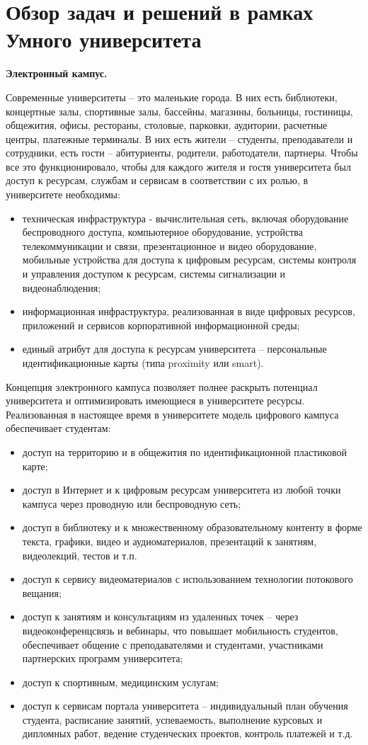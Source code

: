 
\section{Обзор задач и решений в рамках Умного университета}

\textbf{Электронный кампус.}

Современные университеты – это маленькие города.\cite{Cisco} В них есть библиотеки, концертные залы, спортивные залы, бассейны, магазины, больницы, гостиницы, общежития, офисы, рестораны, столовые, парковки, аудитории, расчетные центры, платежные терминалы. В них есть жители – студенты, преподаватели и сотрудники, есть гости – абитуриенты, родители, работодатели, партнеры. Чтобы все это функционировало, чтобы для каждого жителя и гостя университета был доступ к ресурсам, службам и сервисам в соответствии с их ролью,  в университете необходимы:
 \begin{itemize}
	\item техническая инфраструктура - вычислительная сеть, включая оборудование беспроводного доступа, компьютерное оборудование, устройства телекоммуникации и связи, презентационное и видео оборудование, мобильные устройства для доступа к цифровым ресурсам,  системы контроля и управления доступом к ресурсам, системы сигнализации и видеонаблюдения;
	\item информационная инфраструктура, реализованная в виде цифровых ресурсов, приложений и сервисов корпоративной информационной среды;
	\item единый атрибут для доступа к ресурсам университета – персональные идентификационные карты  (типа proximity или smart).
\end{itemize}
Концепция электронного кампуса позволяет полнее раскрыть потенциал университета и оптимизировать имеющиеся в университете ресурсы. Реализованная в настоящее время в университете модель  цифрового  кампуса обеспечивает студентам:
\begin{itemize}
	\item доступ на территорию и  в общежития по  идентификационной пластиковой карте;
	\item доступ в Интернет и к цифровым ресурсам университета из любой точки кампуса через проводную или беспроводную сеть;
	\item доступ в библиотеку и к множественному образовательному контенту в форме текста, графики, видео и аудиоматериалов, презентаций к занятиям, видеолекций, тестов  и т.п.
	\item доступ к сервису видеоматериалов с использованием технологии потокового вещания;
	\item доступ к занятиям и консультациям из удаленных точек – через видеоконференцсвязь и вебинары,  что повышает мобильность студентов, обеспечивает общение с преподавателями и студентами, участниками партнерских программ университета;
	\item доступ к спортивным, медицинским услугам;
	\item доступ к сервисам портала университета – индивидуальный план обучения студента, расписание занятий, успеваемость, выполнение курсовых и дипломных работ, ведение студенческих  проектов, контроль платежей и т.д.
\end{itemize}
